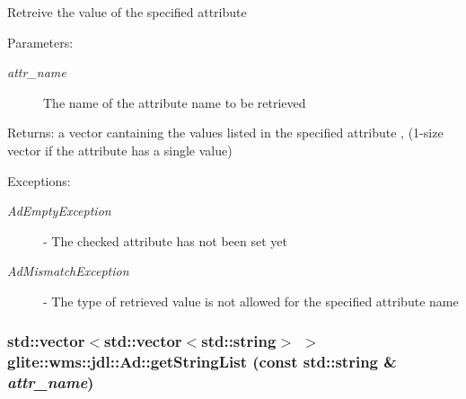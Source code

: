 Retreive the value of the specified attribute \begin{Desc}
\item[Parameters:]
\begin{description}
\item[{\em attr\_\-name}]The name of the attribute name to be retrieved \end{description}
\end{Desc}
\begin{Desc}
\item[Returns:]a vector cantaining the values listed in the specified attribute , (1-size vector if the attribute has a single value) \end{Desc}
\begin{Desc}
\item[Exceptions:]
\begin{description}
\item[{\em Ad\-Empty\-Exception}]- The checked attribute has not been set yet \item[{\em Ad\-Mismatch\-Exception}]- The type of retrieved value is not allowed for the specified attribute name \end{description}
\end{Desc}
\hypertarget{classglite_1_1wms_1_1jdl_1_1Ad_z19_21}{
\subsubsection[getStringList]{\setlength{\rightskip}{0pt plus 5cm}std::vector$<$std::vector$<$std::string$>$ $>$ glite::wms::jdl::Ad::get\-String\-List (const std::string \& {\em attr\_\-name})}}
\label{classglite_1_1wms_1_1jdl_1_1Ad_z19_21}


